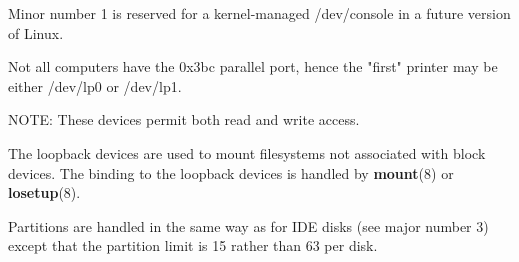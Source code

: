 \noindent
Minor number 1 is reserved for a kernel-managed
{\file /dev/console} in a future version of Linux.

\begin{devicelist}
\end{devicelist}

\noindent
Not all computers have the {\hex 0x3bc} parallel port, hence the
"first" printer may be either {\file /dev/lp0} or {\file /dev/lp1}.

\begin{devicelist}
	\minordots
	\minordots
\end{devicelist}

\noindent
NOTE: These devices permit both read and write access.

\begin{devicelist}
	\minordots
\end{devicelist}

\noindent
The loopback devices are used to mount filesystems not associated with
block devices.  The binding to the loopback devices is handled by
{\bf mount}(8) or {\bf losetup}(8).

\begin{devicelist}
	\minordots
\end{devicelist}

\noindent
Partitions are handled in the same way as for IDE disks (see major
number 3) except that the partition limit is 15 rather than 63 per
disk.

